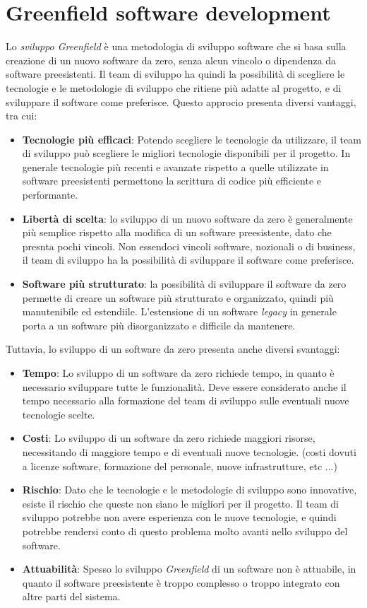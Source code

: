\section{Greenfield software development}
\label{sec:greenfield}
Lo \textit{sviluppo Greenfield} è una metodologia di sviluppo software che si basa sulla creazione di un nuovo software da zero, senza alcun vincolo o dipendenza da software preesistenti.
Il team di sviluppo ha quindi la possibilità di scegliere le tecnologie e le metodologie di sviluppo che ritiene più adatte al progetto, e di sviluppare il software come preferisce.
Questo approcio presenta diversi vantaggi, tra cui:
\begin{itemize}
    \item \textbf{Tecnologie più efficaci}: Potendo scegliere le tecnologie da utilizzare, il team di sviluppo può scegliere le migliori tecnologie disponibili per il progetto. 
    In generale tecnologie più recenti e avanzate rispetto a quelle utilizzate in software preesistenti permettono la scrittura di codice più efficiente e performante.  
    \item \textbf{Libertà di scelta}: lo sviluppo di un nuovo software da zero è generalmente più semplice rispetto alla modifica di un software preesistente, dato che presnta pochi vincoli.
    Non essendoci vincoli software, nozionali o di business, il team di sviluppo ha la possibilità di sviluppare il software come preferisce.
    \item \textbf{Software più strutturato}: la possibilità di sviluppare il software da zero permette di creare un software più strutturato e organizzato, quindi più manutenibile ed estendiile.
    L'estensione di un software \textit{legacy} in generale porta a un software più disorganizzato e difficile da mantenere.
\end{itemize}
Tuttavia, lo sviluppo di un software da zero presenta anche diversi svantaggi:
\begin{itemize}
    \item \textbf{Tempo}: Lo sviluppo di un software da zero richiede tempo, in quanto è necessario sviluppare tutte le funzionalità.
    Deve essere considerato anche il tempo necessario alla formazione del team di sviluppo sulle eventuali nuove tecnologie scelte.
    \item \textbf{Costi}: Lo sviluppo di un software da zero richiede maggiori risorse, necessitando di maggiore tempo e di eventuali nuove tecnologie.
    (costi dovuti a licenze software, formazione del personale, nuove infrastrutture, etc ...)
    \item \textbf{Rischio}: Dato che le tecnologie e le metodologie di sviluppo sono innovative, esiste il rischio che queste non siano le migliori per il progetto.
    Il team di sviluppo potrebbe non avere esperienza con le nuove tecnologie, e quindi potrebbe rendersi conto di questo problema molto avanti nello sviluppo del software.
    \item \textbf{Attuabilità}: Spesso lo sviluppo \textit{Greenfield} di un software non è attuabile, in quanto il software preesistente è troppo complesso o troppo integrato con altre parti del sistema.
\end{itemize}


